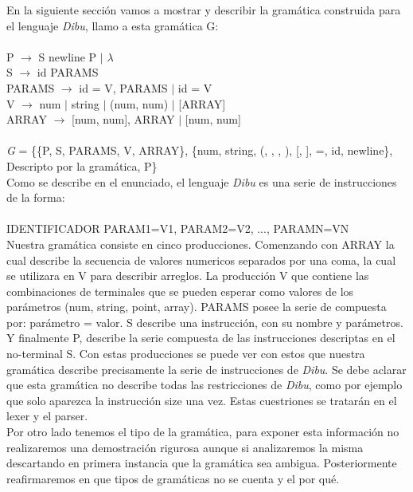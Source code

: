 En la siguiente sección vamos a mostrar y describir la gramática construida para el lenguaje \textit{Dibu}, llamo a esta
gramática G:\\
\\
P $\rightarrow$ S newline P $\mid$ $\lambda$\\
S $\rightarrow$ id PARAMS\\
PARAMS $\rightarrow$  id = V, PARAMS $\mid$ id = V\\
V $\rightarrow$ num $\mid$ string $\mid$ (num, num) $\mid$ [ARRAY]\\
ARRAY $\rightarrow$ [num, num], ARRAY $\mid$ [num, num]\\
\\
\textit{G} = \{\{P, S, PARAMS, V, ARRAY\}, \{num, string, (, , , ), [, ], =, id, newline\}, Descripto por la gramática, P\}\\

Como se describe en el enunciado, el lenguaje \textit{Dibu} es una serie de instrucciones de la forma:\\
\\
IDENTIFICADOR PARAM1=V1, PARAM2=V2, ..., PARAMN=VN\\

Nuestra gramática consiste en cinco producciones. Comenzando con ARRAY la cual describe la secuencia de valores numericos
separados por una coma, la cual se utilizara en V para describir arreglos. La producción V que contiene las combinaciones
de terminales que se pueden esperar como valores de los parámetros (num, string, point, array).
PARAMS posee la serie de compuesta por: parámetro = valor. S describe una instrucción, con su nombre y parámetros. Y
finalmente P, describe la serie compuesta de las instrucciones descriptas en el no-terminal S. Con estas producciones se
puede ver con estos que nuestra gramática describe precisamente la serie de instrucciones de \textit{Dibu}. Se debe
aclarar que esta gramática no describe todas las restricciones de \textit{Dibu}, como por ejemplo que solo aparezca la
instrucción size una vez. Estas cuestriones se tratarán en el lexer y el parser.\\

Por otro lado tenemos el tipo de la gramática, para exponer esta información no realizaremos una demostración rigurosa
aunque si analizaremos la misma descartando en primera instancia que la gramática sea ambigua. Posteriormente reafirmaremos
en que tipos de gramáticas no se cuenta y el por qué.\\

